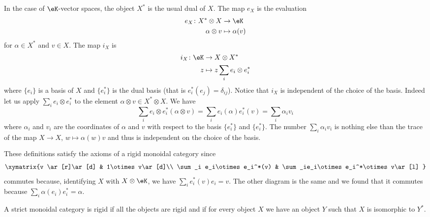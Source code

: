 \begin{example}
    In the case of \( \eK\)-vector spaces, the object \( X^*\) is the usual dual of \( X\). The map \( e_X\) is the evaluation
    \begin{equation}
        \begin{aligned}
            e_X\colon X^*\otimes X&\to \eK \\
            \alpha\otimes v&\mapsto \alpha(v)
        \end{aligned}
    \end{equation}
    for \( \alpha\in X^*\) and \( v\in X\). The map \( i_X\) is
    \begin{equation}
        \begin{aligned}
            i_X\colon \eK&\to X\otimes X^* \\
            z&\mapsto z\sum_i e_i\otimes e^*_i
        \end{aligned}
    \end{equation}
    where \( \{ e_i \}\) is a basis of \( X\) and \( \{ e_i^* \} \) is the dual basis (that is \( e_i^*(e_j)=\delta_{ij}\)). Notice that \( i_X\) is independent of the choice of the basis. Indeed let us apply \( \sum_ie_i\otimes e_i^*\) to the element \( \alpha\otimes v\in X^*\otimes X\). We have
    \begin{equation}
        \sum_ie_i\otimes e_i^*(\alpha\otimes v)=\sum_ie_i(\alpha)e_i^*(v)=\sum_i\alpha_i v_i
    \end{equation}
    where \( \alpha_i\) and \( v_i\) are the coordinates of \( \alpha\) and \( v\) with respect to the basis \( \{ e_i^* \}\) and \( \{ e_i^* \}\). The number \( \sum_i\alpha_iv_i\) is nothing else than the trace of the map \( X\to X\), \( w\mapsto\alpha(w)v\) and thus is independent on the choice of the basis.

    These definitions satisfy the axioms of a rigid monoidal category since
    \begin{equation}
        \xymatrix{%
        v \ar[r]\ar[d]        &   1\otimes v\ar[d]\\
           \sum_i e_i\otimes e_i^*(v)   &   \sum_ie_i\otimes e_i^*\otimes v\ar[l]
           }
    \end{equation}
    commutes because, identifying \( X\) with \( X\otimes\eK\), we have \( \sum_ie_i^*(v)e_i=v\). The other diagram is the same and we found that it commutes because \( \sum_i\alpha(e_i)e_i^*=\alpha\).
\end{example}

A strict monoidal category is rigid if all the objects are rigid and if for every object \( X\) we have an object \( Y\) such that \( X\) is isomorphic to \( Y^*\).

